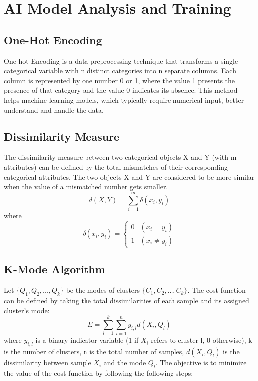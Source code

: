 \documentclass{article}
\begin{document}
\section{AI Model Analysis and Training}
\subsection{One-Hot Encoding}
One-hot Encoding is a data preprocessing technique that transforms a single categorical variable with n distinct categories 
into n separate columns. Each column is represented by one number 0 or 1, where the value 1 presents the presence of that category 
and the value 0 indicates its absence. This method helps machine learning models, which typically require numerical input, 
better understand and handle the data.

\subsection{Dissimilarity Measure}
The dissimilarity measure between two categorical objects X and Y (with m attributes) can be defined by the total mismatches of their corresponding categorical attributes. The two objects X and Y are considered to be more similar when the value of a mismatched number gets smaller.
        $$d(X,Y) = \sum_{i=1}^{m}\delta{(x_i,y_i)}$$ where $$\delta{(x_i,y_i)} = \left\{\begin{array}{ll} 0 & (x_i = y_i) \\
        1 & (x_i \neq y_i)\end{array}\right.$$

\subsection{K-Mode Algorithm}
Let $\{Q_1,Q_2,...,Q_k\}$ be the modes of clusters $\{C_1,C_2,...,C_k\}$. The cost function can be defined by taking the total dissimilarities of each sample and its assigned cluster's mode: 
$$E = \sum_{l=1}^{k}\sum_{i=1}^{n}y_{i,l}d(X_i,Q_l)$$ 
where $y_{i,l}$ is a binary indicator variable (1 if $X_i$ refers to cluster l, 0 otherwise), k is the number of clusters, n is the total number of samples, $d(X_i,Q_l)$ is the dissimilarity between sample $X_i$ and the mode $Q_l$. The objective is to minimize the value of the cost function by following the following steps: 
\end{document}
